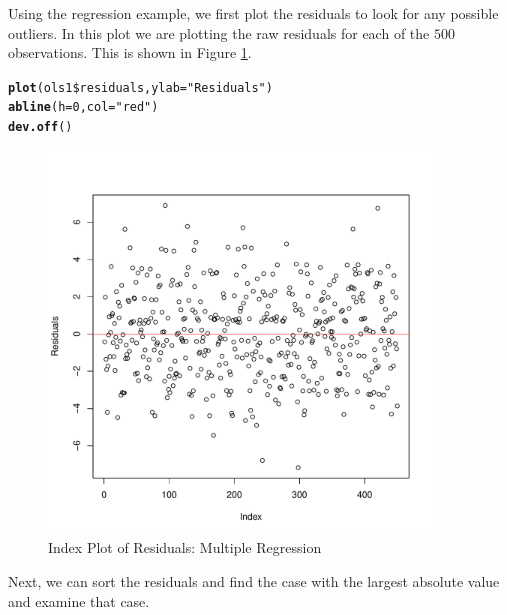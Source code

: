 \documentclass[11pt,openany]{book}\usepackage[]{graphicx}\usepackage[]{color}
\makeatletter
\newcommand{\hlnum}[1]{\textcolor[rgb]{0.686,0.059,0.569}{#1}}%
\newcommand{\hlstr}[1]{\textcolor[rgb]{0.192,0.494,0.8}{#1}}%
\newcommand{\hlopt}[1]{\textcolor[rgb]{0,0,0}{#1}}%
\newcommand{\hlstd}[1]{\textcolor[rgb]{0.345,0.345,0.345}{#1}}%
\newcommand{\hlkwc}[1]{\textcolor[rgb]{0.333,0.667,0.333}{#1}}%
\newcommand{\hlkwd}[1]{\textcolor[rgb]{0.737,0.353,0.396}{\textbf{#1}}}%
\newenvironment{kframe}{%
 \def\at@end@of@kframe{}%
 \ifinner\ifhmode%
  \def\at@end@of@kframe{\end{minipage}}%
  \begin{minipage}{\columnwidth}%
 \fi\fi%
 \def\FrameCommand##1{\hskip\@totalleftmargin \hskip-\fboxsep
 \colorbox{shadecolor}{##1}\hskip-\fboxsep
     \hskip-\linewidth \hskip-\@totalleftmargin \hskip\columnwidth}%
 \MakeFramed {\advance\hsize-\width
   \@totalleftmargin\z@ \linewidth\hsize
   \@setminipage}}%
 {\par\unskip\endMakeFramed%
 \at@end@of@kframe}
\newenvironment{knitrout}{}{} %
\renewenvironment{knitrout}{\begin{singlespace}}{\end{singlespace}}
\makeatother
\begin{document}
Using the regression example, we first plot the residuals to look for any possible outliers. In this plot we are plotting the raw residuals for each of the $500$ observations. This is shown in Figure \ref{fig:siminresid}.  

\begin{knitrout}
\color{fgcolor}\begin{kframe}
\begin{alltt}
\hlkwd{plot}\hlstd{(ols1}\hlopt{\$}\hlstd{residuals,} \hlkwc{ylab} \hlstd{=} \hlstr{"Residuals"}\hlstd{)}
\hlkwd{abline}\hlstd{(}\hlkwc{h} \hlstd{=} \hlnum{0}\hlstd{,} \hlkwc{col} \hlstd{=} \hlstr{"red"}\hlstd{)}
\hlkwd{dev.off}\hlstd{()}
\end{alltt}
\end{kframe}
\end{knitrout}

\begin{figure}
        \centering
          \includegraphics[width=4in]{15_Diagnostics/multinresid.pdf}%
        \caption{Index Plot of Residuals: Multiple Regression \label{fig:siminresid}}
\end{figure}        


Next, we can sort the residuals and find the case with the largest absolute value and examine that case.  
\end{document}
